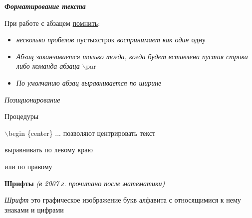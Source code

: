 \documentclass{article}
\begin{document}
\begin{center} \LARGE \bf{{ \textit{Форматирование текста} }} \end {center}

При работе  с абзацем \LARGE  \underline{помнить}:  \normalsize \newline
 
{}
\begin {itemize}
\item \textit{несколько пробелов \(пустых строк\) воспринимает как один \(одну\)}
\item \textit{Абзац заканчивается только тогда, когда будет вставлена пустая строка либо команда абзаца} $\backslash $par
\item \textit{По умолчанию абзац выравнивается по ширине}
\end{itemize}

\textit{Позиционирование}

	\hspace{10pt}Процедуры
\begin{center}
$\backslash $begin \{center\} ...  позволяют центрировать текст \end{center}
\begin{flushleft} выравнивать по левому краю \end{flushleft}
\begin {flushright} или по правому \end {flushright}
\begin {center} 
\linespread{1.3}
{\bf Шрифты} {\it (в 2007 г. прочитано после математики)}
\end {center}

{\it Шрифт } это \LARGE графическое   изображение букв
алфавита \tiny с относящимися к нему знаками и цифрами
\end{document}
